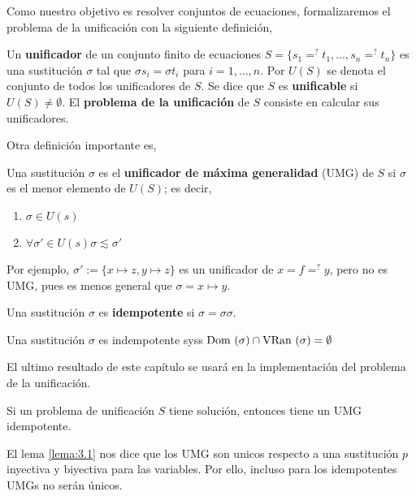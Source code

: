 Como nuestro objetivo es resolver conjuntos de ecuaciones,
formalizaremos el problema de la unificación con la siguiente definición,

\begin{defi}
  Un \textbf{unificador} de un conjunto finito de ecuaciones
  $S = \{ s_1 =^? t_1, \dots, s_n =^? t_n\}$ es una sustitución $\sigma$
  tal que $\sigma s_i = \sigma t_i$ para $i = 1, \dots, n.$ Por $U(S)$
  se denota el conjunto de todos los unificadores de $S$. Se dice que
  $S$ es \textbf{unificable} si $U(S) \neq \emptyset$. El
  \textbf{problema de la unificación} de $S$ consiste en calcular sus
  unificadores.
\end{defi}

Otra definición importante es,

\begin{defi} 
  Una sustitución $\sigma$ es el \textbf{unificador de máxima
    generalidad} (UMG) de $S$ si $\sigma$ es el menor elemento de
  $U(S)$; es decir,
  \begin{enumerate}
  \item $\sigma \in U(s)$
  \item $\forall \sigma' \in U(s) \sigma \lesssim \sigma'$
  \end{enumerate}
\end{defi}

Por ejemplo, $\sigma ' := \{ x \mapsto z, y \mapsto z \}$ es un
unificador de $x=f =^? y$, pero no es UMG, pues es menos general que
$\sigma = {x \mapsto y}$.

\begin{defi}
  Una sustitución $\sigma$ es \textbf{idempotente} si $\sigma = \sigma \sigma$.
\end{defi}

\begin{lema} \label{lema:3.2} Una sustitución $\sigma$ es indempotente
  syss $\mbox{Dom }(\sigma) \cap \mbox{VRan }(\sigma) = \emptyset $
\end{lema}

El ultimo resultado de este capítulo se usará en la implementación del
problema de la unificación.

\begin{teor}
  Si un problema de unificación $S$ tiene solución, entonces tiene un
  UMG idempotente.
\end{teor}

\begin{demo} %
  El lema \ref{lema:3.1} nos dice que los UMG son unicos respecto a
  una sustitución $p$ inyectiva y biyectiva para las variables. Por
  ello, incluso para los idempotentes UMGs no serán únicos.
\end{demo}


